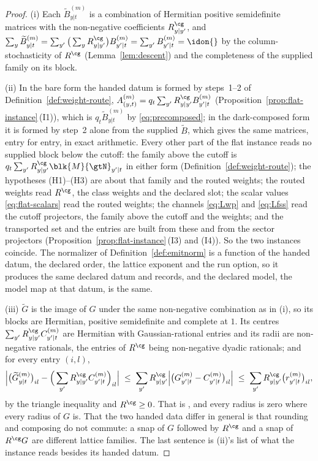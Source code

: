 \begin{proof}
(i) Each $\widetilde B^{(m)}_{y|t}$ is a combination of Hermitian positive
semidefinite matrices with the non-negative coefficients $R^{\cg}_{y|y'}$,
and $\sum_y\widetilde B^{(m)}_{y|t}=\sum_{y'}\big(\sum_yR^{\cg}_{y|y'}\big)
B^{(m)}_{y'|t}=\sum_{y'}B^{(m)}_{y'|t}=\idon{}$ by the column-stochasticity
of $R^{\cg}$ (Lemma~\ref{lem:descent}) and the completeness of the supplied
family on its block.

(ii) In the bare form the handed datum is formed by steps~1--2 of
Definition~\ref{def:weight-route},
$A^{(m)}_{(y,t)}=q_t\sum_{y'}R^{\cg}_{y|y'}B^{(m)}_{y'|t}$
(Proposition~\ref{prop:flat-instance}\,(I1)), which is
$q_t\widetilde B^{(m)}_{y|t}$ by \eqref{eq:precomposed}; in the dark-composed
form it is formed by step~2 alone from the supplied $\widetilde B$, which
gives the same matrices, entry for entry, in exact arithmetic. Every other
part of the flat instance reads no supplied block below the cutoff: the
family above the cutoff is
$q_t\sum_{y'}R^{\cg}_{y|y'}\blk{M}{\gtN}_{y'|t}$ in either form
(Definition~\ref{def:weight-route}); the hypotheses (H1)--(H3) are about that
family and the routed weights; the routed weights read $R^{\cg}$, the class
weights and the declared slot; the scalar values
\eqref{eq:flat-scalars} read the routed weights; the channels \eqref{eq:Lwp}
and \eqref{eq:Lfss} read the cutoff projectors, the family above the cutoff
and the weights; and the transported set and the entries are built from
these and from the sector projectors (Proposition~\ref{prop:flat-instance}\,(I3)
and (I4)). So the two instances coincide. The normalizer of
Definition~\ref{def:emitnorm} is a function of the handed datum, the
declared order, the lattice exponent and the run option, so it produces the
same declared datum and records, and the declared model, the model map at
that datum, is the same.

(iii) $\widetilde G$ is the image of $G$ under the same non-negative
combination as in (i), so its blocks are Hermitian, positive semidefinite and
complete at $1$. Its centres $\sum_{y'}R^{\cg}_{y|y'}C^{(m)}_{y'|t}$ are
Hermitian with Gaussian-rational entries and its radii are non-negative
rationals, the entries of $R^{\cg}$ being non-negative dyadic rationals; and
for every entry $(i,l)$,
\begin{equation*}
  \Big|\big(\widetilde G^{(m)}_{y|t}\big)_{il}
    -\Big(\sum_{y'}R^{\cg}_{y|y'}C^{(m)}_{y'|t}\Big)_{il}\Big|
  \;\le\;\sum_{y'}R^{\cg}_{y|y'}\Big|\big(G^{(m)}_{y'|t}-C^{(m)}_{y'|t}\big)_{il}\Big|
  \;\le\;\sum_{y'}R^{\cg}_{y|y'}\big(r^{(m)}_{y'|t}\big)_{il},
\end{equation*}
by the triangle inequality and $R^{\cg}\ge0$. That is
, and every radius is zero where every
radius of $G$ is. That the two handed data differ in general
is that rounding and composing do not commute: a snap of $G$ followed by
$R^{\cg}$ and a snap of $R^{\cg}G$ are different lattice families. The last
sentence is (ii)'s list of what the instance reads besides its handed datum.
\end{proof}
